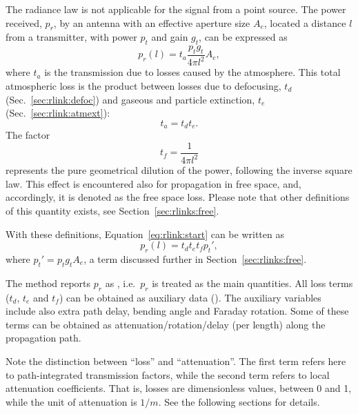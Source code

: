 The radiance law is not applicable for the signal from a point source.
The power received, $p_r$, by an antenna with an effective aperture size
$A_e$, located a distance $l$ from a transmitter, with power
$p_t$ and gain $g_t$, can be expressed as \citep[e.g.][]{ippolito:satco:08}
\begin{equation}
  \label{eq:rlink:start}
  p_r(l) = t_a\frac{p_tg_t}{4\pi l^2}A_e,
\end{equation}
where $t_a$ is the transmission due to losses caused by the atmosphere. This
total atmospheric loss is the product between losses due to defocusing,
$t_d$ (Sec.~\ref{sec:rlink:defoc}) and gaseous and particle extinction, $t_e$
(Sec.~\ref{sec:rlink:atmext}):
\begin{equation}
  t_a = t_d t_e.
\end{equation}
The factor
\begin{equation}
  \label{eq:rlink:fspl}
  t_f = \frac{1}{4\pi l^2}
\end{equation}
represents the pure geometrical dilution of the power, following the inverse
square law. This effect is encountered also for propagation in free space, and,
accordingly, it is denoted as the free space loss. Please note that
other definitions of this quantity exists, see Section~\ref{sec:rlinks:free}.

With these definitions, Equation~\ref{eq:rlink:start} can be written as
\begin{equation}
  \label{eq:rlink:pr}
  p_r(l) = t_d t_e t_f p_t',
\end{equation}
where $p_t'=p_tg_tA_e$, a term discussed further in
Section~\ref{sec:rlinks:free}.

The method  reports $p_r$ as , i.e.\ $p_r$
is treated as the main quantities. All loss terms ($t_d$, $t_e$ and $t_f$) can
be obtained as auxiliary data (). The auxiliary variables
include also extra path delay, bending angle and Faraday rotation. Some of
these terms can be obtained as attenuation/rotation/delay (per length) along the
propagation path.

Note the distinction between ``loss'' and ``attenuation''. The first term
refers here to path-integrated transmission factors, while the second term
refers to local attenuation coefficients. That is, losses are dimensionless
values, between 0 and 1, while the unit of attenuation is $1/m$. See the
following sections for details.

